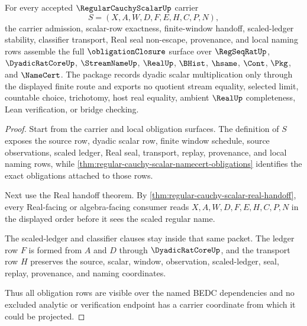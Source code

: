 \begin{theorem}
\label{thm:regular-cauchy-scalar-obligation-closure-package}
For every accepted $\RegularCauchyScalarUp$ carrier
$$
S=(X,A,W,D,F,E,H,C,P,N),
$$
the carrier admission, scalar-row exactness, finite-window handoff, scaled-ledger stability, classifier transport, Real seal non-escape, provenance, and local naming rows assemble the full $\obligationClosure$ surface over $\RegSeqRatUp$, $\DyadicRatCoreUp$, $\StreamNameUp$, $\RealUp$, $\BHist$, $\hsame$, $\Cont$, $\Pkg$, and $\NameCert$. The package records dyadic scalar multiplication only through the displayed finite route and exports no quotient stream equality, selected limit, countable choice, trichotomy, host real equality, ambient $\RealUp$ completeness, Lean verification, or bridge checking.
\end{theorem}
\begin{proof}
Start from the carrier and local obligation surfaces. The definition of $S$ exposes the source row, dyadic scalar row, finite window schedule, source observations, scaled ledger, Real seal, transport, replay, provenance, and local naming rows, while \autoref{thm:regular-cauchy-scalar-namecert-obligations} identifies the exact obligations attached to those rows.

Next use the Real handoff theorem. By \autoref{thm:regular-cauchy-scalar-real-handoff}, every Real-facing or algebra-facing consumer reads $X,A,W,D,F,E,H,C,P,N$ in the displayed order before it sees the scaled regular name.

The scaled-ledger and classifier clauses stay inside that same packet. The ledger row $F$ is formed from $A$ and $D$ through $\DyadicRatCoreUp$, and the transport row $H$ preserves the source, scalar, window, observation, scaled-ledger, seal, replay, provenance, and naming coordinates.

Thus all obligation rows are visible over the named BEDC dependencies and no excluded analytic or verification endpoint has a carrier coordinate from which it could be projected.
\end{proof}

